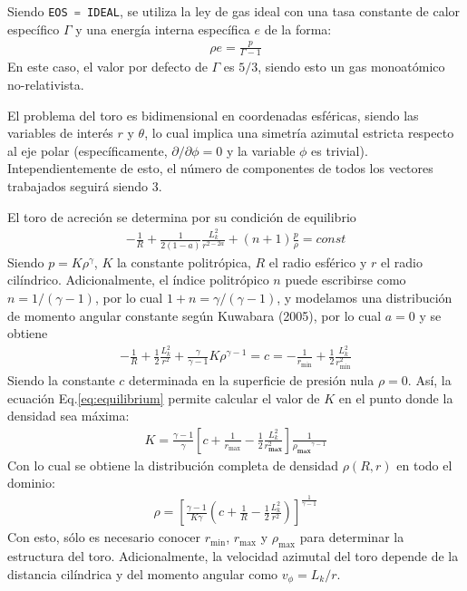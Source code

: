 \documentclass[11pt, letterpaper]{article}
\begin{document}
\medskip

Siendo \lstinline[language=C]{EOS = IDEAL}, se utiliza la ley de gas ideal con una tasa constante de calor específico $\Gamma$ y una energía interna específica $e$ de la forma:
\begin{align*}
    \rho e = \frac{p}{\Gamma - 1}
\end{align*}
En este caso, el valor por defecto de $\Gamma$ es $5/3$, siendo esto un gas monoatómico no-relativista.\cite{plutomanual}

\medskip

El problema del toro es bidimensional en coordenadas esféricas, siendo las variables de interés $r$ y $\theta$, lo cual implica una simetría azimutal estricta respecto al eje polar (específicamente, $\partial / \partial \phi = 0$ y la variable $\phi$ es trivial). Intependientemente de esto, el número de componentes de todos los vectores trabajados seguirá siendo 3.

\medskip

El toro de acreción se determina por su condición de equilibrio
\begin{align*}
    -\frac{1}{R} + \frac{1}{2(1-a)} \frac{L_k^2}{r^{2-2a}} + (n+1)\frac{p}{\rho} = const
\end{align*}
Siendo $p = K\rho^{\gamma}$, $K$ la constante politrópica, $R$ el radio esférico y $r$ el radio cilíndrico. Adicionalmente, el índice politrópico $n$ puede escribirse como $n = 1 /(\gamma - 1)$, por lo cual $1 + n = \gamma / (\gamma - 1)$, y modelamos una distribución de momento angular constante según Kuwabara (2005)\cite{Kuwabara}, por lo cual $a = 0$ y se obtiene
\begin{align}\label{eq:equilibrium}
    -\frac{1}{R} + \frac{1}{2}\frac{L_k^2}{r^2} + \frac{\gamma}{\gamma-1}K\rho^{\gamma-1} = c = -\frac{1}{r_{\min}} + \frac{1}{2}\frac{L_k^2}{r_{\min}^2}
\end{align}
Siendo la constante $c$ determinada en la superficie de presión nula $\rho = 0$. Así, la ecuación Eq.\ref{eq:equilibrium} permite calcular el valor de $K$ en el punto donde la densidad sea máxima:
\begin{align}\label{eq:K_rhomax}
    K = \frac{\gamma - 1}{\gamma} \left[c + \frac{1}{r_{\max}} - \frac{1}{2}\frac{L_k^2}{r_{\textbf{max}}^2}\right] \frac{1}{{\rho_{\textbf{max}}}^{\gamma -1}}
\end{align}
Con lo cual se obtiene la distribución completa de densidad $\rho(R, r)$ en todo el dominio:
\begin{align}\label{eq:rho}
    \rho = \left[ \frac{\gamma - 1}{K\gamma} \left(c+ \frac{1}{R} - \frac{1}{2} \frac{L_k^2}{r^2}\right) \right]^{\frac{1}{\gamma - 1}}
\end{align}
Con esto, sólo es necesario conocer $r_{\min}$, $r_{\max}$ y $\rho_{\max}$ para determinar la estructura del toro. Adicionalmente, la velocidad azimutal del toro depende de la distancia cilíndrica y del momento angular como $v_\phi = L_k / r$.
\end{document}
